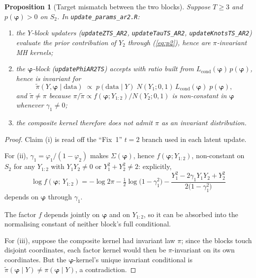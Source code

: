 \documentclass[11pt]{article}
\newcommand{\eref}[1]{(\ref{#1})}
\newcommand{\Lcond}{L_{\mathrm{cond}}}
\newcommand{\bphi}{\boldsymbol{\varphi}}
\theoremstyle{plain}
\newtheorem{proposition}{Proposition}[section]
\theoremstyle{definition}
\theoremstyle{remark}
\begin{document}
\begin{proposition}[Target mismatch between the two blocks]\label{prop:mismatch}
Suppose $T \geq 3$ and $p(\bphi) > 0$ on $S_2$. In
\texttt{update\_params\_ar2.R}:
\begin{enumerate}[label=(\roman*)]
  \item the $Y$-block updaters (\texttt{updateZTS\_AR2},
        \texttt{updateTauTS\_AR2}, \texttt{updateKnotsTS\_AR2}) evaluate the
        prior contribution of $Y_2$ through \eref{eq:p2}, hence are
        $\pi$-invariant MH kernels;
  \item the $\bphi$-block (\texttt{updatePhiAR2TS}) accepts with ratio built
        from $\Lcond(\bphi)\, p(\bphi)$, hence is invariant for
        \begin{equation}\label{eq:tildepi}
          \tilde{\pi}(Y, \bphi \mid \text{data})
          \;\propto\;
          p(\text{data} \mid Y)\;
          N(Y_1; 0, 1)\, \Lcond(\bphi)\; p(\bphi),
        \end{equation}
        and $\tilde{\pi} \neq \pi$ because
        $\pi / \tilde{\pi} \propto f(\bphi; Y_{1:2}) / N(Y_2; 0, 1)$ is
        non-constant in $\bphi$ whenever $\gamma_1 \neq 0$;
  \item the composite kernel therefore does not admit $\pi$ as an invariant
        distribution.
\end{enumerate}
\end{proposition}

\begin{proof}
Claim (i) is read off the ``Fix~1'' $t = 2$ branch used in each latent
update.

For (ii), $\gamma_1 = \varphi_1 / (1 - \varphi_2)$ makes $\Sigma(\bphi)$,
hence $f(\bphi; Y_{1:2})$, non-constant on $S_2$ for any $Y_{1:2}$ with
$Y_1 Y_2 \neq 0$ or $Y_1^2 + Y_2^2 \neq 2$: explicitly,
\begin{equation}\label{eq:logf}
  \log f(\bphi;\, Y_{1:2})
  = -\log 2\pi
    - \tfrac{1}{2} \log\bigl( 1 - \gamma_1^2 \bigr)
    - \frac{Y_1^2 - 2 \gamma_1 Y_1 Y_2 + Y_2^2}
           {2 \bigl( 1 - \gamma_1^2 \bigr)}
\end{equation}
depends on $\bphi$ through $\gamma_1$.

The factor $f$ depends jointly on $\bphi$ and on $Y_{1:2}$, so it can be
absorbed into the normalising constant of neither block's full conditional.

For (iii), suppose the composite kernel had invariant law $\pi$; since the
blocks touch disjoint coordinates, each factor kernel would then be
$\pi$-invariant on its own coordinates. But the $\bphi$-kernel's unique
invariant conditional is
$\tilde{\pi}(\bphi \mid Y) \neq \pi(\bphi \mid Y)$, a contradiction.
\end{proof}
\end{document}
